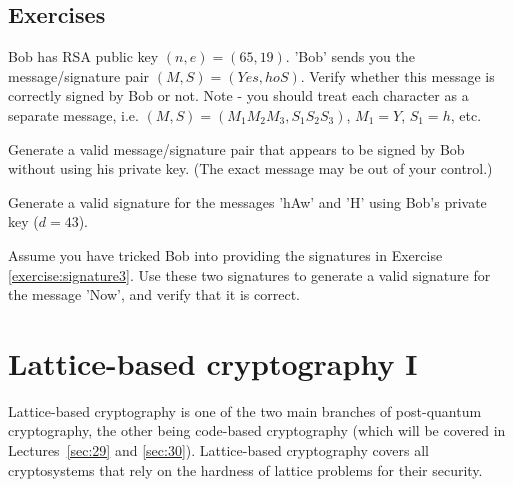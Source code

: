 \documentclass[a4paper, 11pt, openany]{book}
\begin{document}

\subsection{Exercises}

\begin{exercise} \label{exercise:signature1}
Bob has RSA public key $(n,e)=(65,19)$. 'Bob' sends you the message/signature pair $(M,S) = (Yes,hoS)$. Verify whether this message is correctly signed by Bob or not. Note - you should treat each character as a separate message, i.e. $(M,S)=(M_1 M_2 M_3, S_1 S_2 S_3)$, $M_1=Y$, $S_1=h$, etc.
\end{exercise}

\begin{exercise} \label{exercise:signature2}
Generate a valid message/signature pair that appears to be signed by Bob without using his private key. (The exact message may be out of your control.)
\end{exercise}

\begin{exercise} \label{exercise:signature3}
Generate a valid signature for the messages 'hAw' and 'H' using Bob's private key ($d=43$).
\end{exercise}

\begin{exercise} \label{exercise:signature4}
Assume you have tricked Bob into providing the signatures in Exercise \ref{exercise:signature3}. Use these two signatures to generate a valid signature for the message 'Now', and verify that it is correct.
\end{exercise}





\section{Lattice-based cryptography I}
\label{sec:19}
Lattice-based cryptography is one of the two main branches of post-quantum cryptography, the other being code-based cryptography (which will be covered in Lectures~\ref{sec:29} and \ref{sec:30}). Lattice-based cryptography covers all cryptosystems that rely on the hardness of lattice problems for their security.
\end{document}
